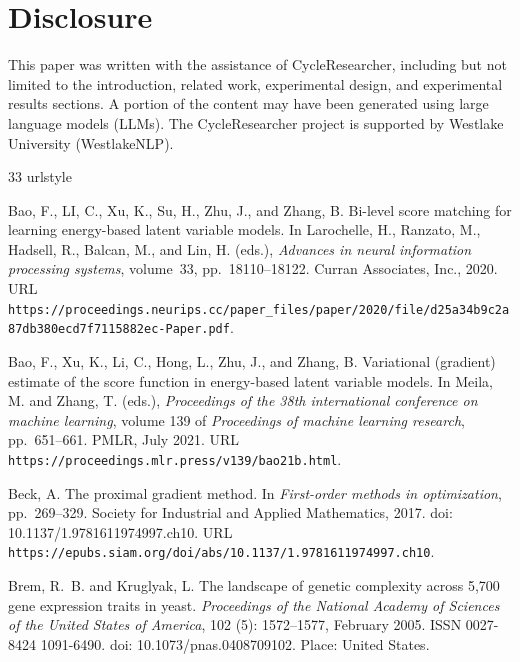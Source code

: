 \documentclass{article} %
\begin{document}
\section{Disclosure}

This paper was written with the assistance of CycleResearcher, including but not limited to the introduction, related work, experimental design, and experimental results sections. A portion of the content may have been generated using large language models (LLMs). The CycleResearcher project is supported by Westlake University (WestlakeNLP).

\begin{thebibliography}{33}
\providecommand{\natexlab}[1]{#1}
\providecommand{\url}[1]{\texttt{#1}}
\expandafter\ifx\csname urlstyle\endcsname\relax
  \providecommand{\doi}[1]{doi: #1}\else
  \providecommand{\doi}{doi: \begingroup \urlstyle{rm}\Url}\fi

Bao, F., LI, C., Xu, K., Su, H., Zhu, J., and Zhang, B.
\newblock Bi-level score matching for learning energy-based latent variable models.
\newblock In Larochelle, H., Ranzato, M., Hadsell, R., Balcan, M., and Lin, H. (eds.), \emph{Advances in neural information processing systems}, volume~33, pp.\  18110--18122. Curran Associates, Inc., 2020.
\newblock URL \url{https://proceedings.neurips.cc/paper_files/paper/2020/file/d25a34b9c2a87db380ecd7f7115882ec-Paper.pdf}.

Bao, F., Xu, K., Li, C., Hong, L., Zhu, J., and Zhang, B.
\newblock Variational (gradient) estimate of the score function in energy-based latent variable models.
\newblock In Meila, M. and Zhang, T. (eds.), \emph{Proceedings of the 38th international conference on machine learning}, volume 139 of \emph{Proceedings of machine learning research}, pp.\  651--661. PMLR, July 2021.
\newblock URL \url{https://proceedings.mlr.press/v139/bao21b.html}.

Beck, A.
\newblock The proximal gradient method.
\newblock In \emph{First-order methods in optimization}, pp.\  269--329. Society for Industrial and Applied Mathematics, 2017.
\newblock \doi{10.1137/1.9781611974997.ch10}.
\newblock URL \url{https://epubs.siam.org/doi/abs/10.1137/1.9781611974997.ch10}.

Brem, R.~B. and Kruglyak, L.
\newblock The landscape of genetic complexity across 5,700 gene expression traits in yeast.
\newblock \emph{Proceedings of the National Academy of Sciences of the United States of America}, 102 (5): 1572--1577, February 2005.
\newblock ISSN 0027-8424 1091-6490.
\newblock \doi{10.1073/pnas.0408709102}.
\newblock Place: United States.


\end{thebibliography}
\end{document}
